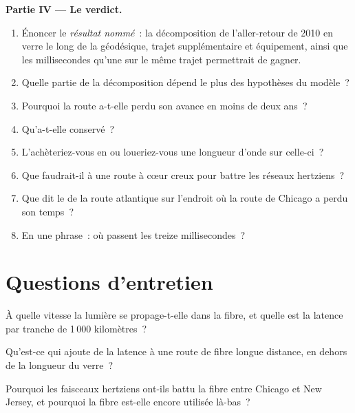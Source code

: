 \begin{problem}
\medskip\noindent\textbf{Partie IV --- Le verdict.}
\begin{enumerate}[resume]
\item Énoncer le \emph{résultat nommé}~: la décomposition de l'aller-retour de 2010 en verre le long de la géodésique, trajet supplémentaire et équipement, ainsi que les millisecondes
  qu'une  sur le même trajet permettrait de gagner.
\item Quelle partie de la décomposition dépend le plus des hypothèses du modèle~?
\item Pourquoi la route a-t-elle perdu son avance en moins de deux ans~?
\item Qu'a-t-elle conservé~?
\item L'achèteriez-vous en  ou loueriez-vous une longueur d'onde sur celle-ci~?
\item Que faudrait-il à une route à cœur creux pour battre les réseaux hertziens~?
\item Que dit le  de la route atlantique sur l'endroit où la route de Chicago a perdu son temps~?
\item En une phrase~: où passent les treize millisecondes~?
\end{enumerate}
\end{problem}

\section{Questions d'entretien}

\begin{interviewq}\label{iq:nw:long-haul-fibre:1}
À quelle vitesse la lumière se propage-t-elle dans la fibre, et quelle est la latence par tranche de 1\,000 kilomètres~?
\end{interviewq}

\begin{interviewq}\label{iq:nw:long-haul-fibre:2}
Qu'est-ce qui ajoute de la latence à une route de fibre longue distance, en dehors de la longueur du verre~?
\end{interviewq}

\begin{interviewq}\label{iq:nw:long-haul-fibre:3}
Pourquoi les faisceaux hertziens ont-ils battu la fibre entre Chicago et New Jersey, et pourquoi la fibre est-elle encore utilisée là-bas~?
\end{interviewq}

